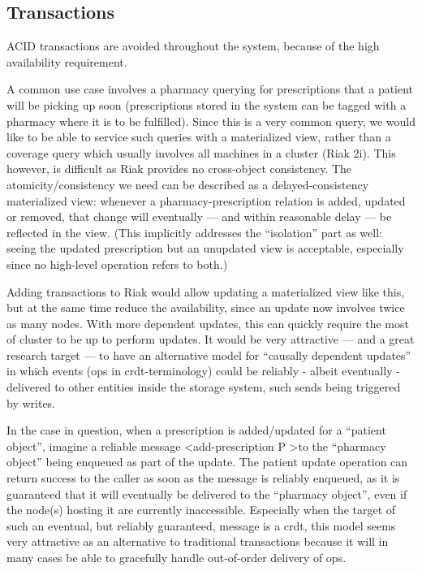 \documentclass[11pt,a4paper]{report}
\begin{document}
\subsection{Transactions}
ACID transactions are avoided throughout the system, because of the high availability requirement.

A common use case involves a pharmacy querying for prescriptions that a patient will be picking up soon (prescriptions stored in the system can be tagged with a pharmacy where it is to be fulfilled). Since this is a very common query, we would like to be able to service such queries with a materialized view, rather than a coverage query which usually involves all machines in a cluster (Riak 2i). This however, is difficult as Riak provides no cross-object consistency.
The atomicity/consistency we need can be described as a delayed-consistency materialized view: whenever a pharmacy-prescription relation is added, updated or removed, that change will eventually — and within reasonable delay — be reflected in the view.
(This implicitly addresses the ``isolation'' part as well: seeing the updated prescription but an unupdated view is acceptable, especially since no high-level operation refers to both.)

Adding transactions to Riak would allow updating a materialized view like this, but at the same time reduce the availability, since an update now involves twice as many nodes. With more dependent updates, this can quickly require the most of cluster to be up to perform updates.
It would be very attractive — and a great research target — to have an alternative model for ``causally dependent updates'' in which events (ops in \gls{crdt}-terminology) could be reliably - albeit eventually - delivered to other entities inside the storage system, such sends being triggered by writes.

In the case in question, when a prescription is added/updated for a ``patient object'', imagine a reliable message  \textless add-prescription P \textgreater to the ``pharmacy object'' being enqueued as part of the update. The patient update operation can return success to the caller as soon as the message is reliably enqueued, as it is guaranteed that it will eventually be delivered to the ``pharmacy object'', even if the node(s) hosting it are currently inaccessible. Especially when the target of such an eventual, but reliably guaranteed, message is a \gls{crdt}, this model seems very attractive as an alternative to traditional transactions because it will in many cases be able to gracefully handle out-of-order delivery of ops.
  
\end{document}
